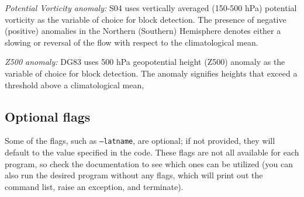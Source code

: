 \documentclass{article}
\begin{document}
\textit{Potential Vorticity anomaly:} S04 uses vertically averaged (150-500 hPa) potential vorticity as the variable of choice for block detection. The presence of negative (positive) anomalies in the Northern (Southern) Hemisphere denotes either a slowing or reversal of the flow with respect to the climatological mean. 

\textit{Z500 anomaly:} DG83 uses 500 hPa geopotential height (Z500) anomaly as the variable of choice for block detection. The anomaly signifies heights that exceed a threshold above a climatological mean, 

\subsection{Optional flags}\label{option}

Some of the flags, such as \texttt{--latname}, are optional; if not provided, they will default to the value specified in the code. These flags are not all available for each program, so check the documentation to see which ones can be utilized (you can also run the desired program without any flags, which will print out the command list, raise an exception, and terminate).
\end{document}
